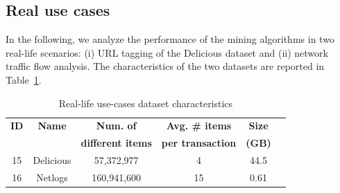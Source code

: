 

\subsection{Real use cases}
\label{survey_usecases}

In the following, we analyze the performance of the mining algorithms in two
real-life scenarios:
(i) URL tagging of the Delicious dataset and
(ii) network traffic flow analysis.
The characteristics of the two datasets
are reported in Table~\ref{survey_datasets_real}.

\begin{table}[h!]
\scriptsize
\begin{center}
\caption{Real-life use-cases dataset characteristics}
\label{survey_datasets_real}
\begin{tabular}{|c|c|c|c|c|c|}
\hline
{\bf ID }& {\bf Name} 	&  {\bf Num. of} 	& {\bf  Avg. \# items} 			& {\bf Size} \\
{\bf  }& {\bf  } 		&  {\bf different items} 	& {\bf  per transaction} 	& {\bf (GB) } \\
\hline
\hline
15& Delicious & 57,372,977 & 4 & 44.5 \\ \hline
16 & Netlogs & 160,941,600 & 15 & 0.61  \\ \hline
\end{tabular}
\end{center}
\end{table}





